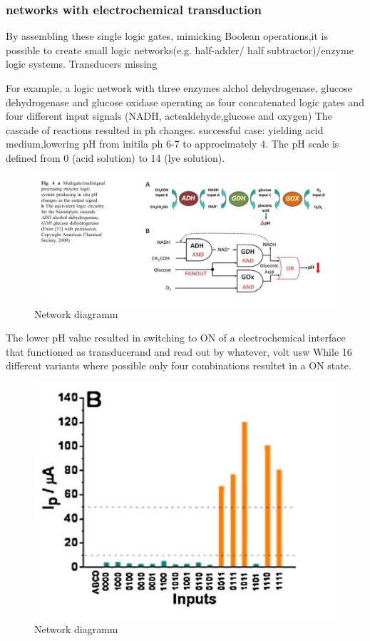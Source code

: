 \documentclass[runningheads]{llncs}
\begin{document}
	\subsubsection{networks with electrochemical transduction}
	By assembling these single logic gates, mimicking Boolean operations,it is possible to create small logic networks(e.g. half-adder/ half subtractor)/enzyme logic systems. Transducers missing 
	
	For example, a logic network with three enzymes alchol dehydrogenase, glucose dehydrogenase and glucose oxidase operating as four concatenated logic gates and four different input signals (NADH,  actealdehyde,glucose and oxygen) The cascade of reactions resulted in ph changes. 
	successful case: yielding acid medium,lowering pH from initila ph 6-7 to approcimately 4. The pH scale is defined from 0 (acid solution) to 14 (lye solution).
	
	\begin{figure}[H] \centering \includegraphics[scale= 0.3]{pics/biocomputing_sensor.png} \caption{Network diagramm} \label{img:grafik-test} \end{figure}
	
	
	The lower pH value resulted in switching to ON of a electrochemical interface that functioned as transducerand and  read out by whatever, volt usw
	While 16 different variants where possible only four combinations resultet in a ON state.

	\begin{figure}[H] \centering \includegraphics[scale= 0.2]{pics/ph.png} \caption{Network diagramm} \label{img:ph} \end{figure}
	
\end{document}
